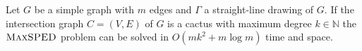 \documentclass[a4paper,english,numberwithinsect]{eurocg18}
\newcommand{\maxsped}{\ensuremath{\textsc{MaxSPED}}\xspace}
\newcommand{\sollong}{\ensuremath{\textit{long}}\xspace}
\newcommand{\solmid}{\ensuremath{\textit{mid}}\xspace}
\newcommand{\solshort}{\ensuremath{\textit{short}}\xspace}
\begin{document}
%

\begin{theorem}
	Let $ G $ be a simple graph with $m$ edges and $ \Gamma $ a straight-line drawing of $ G $. If the intersection graph $ C = (V,E) $ of $ G $ is a cactus with maximum degree $ k \in \mathbb{N} $ the \maxsped problem can be solved in $ O(mk^2 + m \log m) $ time and space.
\end{theorem}
\end{document}
